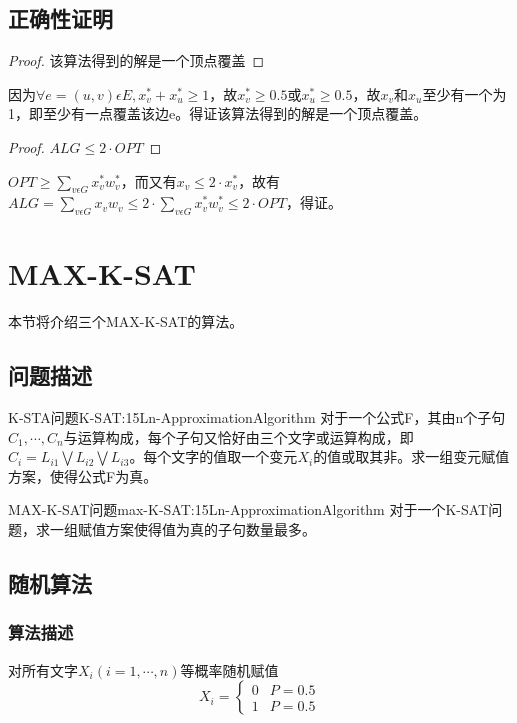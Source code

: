 \subsection{正确性证明}

\begin{proof}
	该算法得到的解是一个顶点覆盖
\end{proof}
	因为$\forall e=(u,v)\epsilon E,x_v^*+x_u^*\geqslant 1$，故$x_v^*\geqslant 0.5$或$x_u^*\geqslant 0.5$，故$x_v$和$x_u$至少有一个为1，即至少有一点覆盖该边e。得证该算法得到的解是一个顶点覆盖。
\begin{proof}
	$ALG\leqslant 2\cdot OPT$
\end{proof}
	$OPT\geqslant \sum\limits_{v\epsilon G} x_v^*w_v^*$，而又有$x_v\leqslant 2\cdot x_v^*$，故有
	$ALG=\sum\limits_{v\epsilon G} x_vw_v\leqslant 2\cdot \sum\limits_{v\epsilon G} x_v^*w_v^*\leqslant 2\cdot OPT$，得证。

\section{MAX-K-SAT}

本节将介绍三个MAX-K-SAT的算法。

\subsection{问题描述}

\begin{definition}{K-STA问题}{K-SAT:15Ln-ApproximationAlgorithm}
	对于一个公式F，其由n个子句${C_1,\cdots ,C_n}$与运算构成，每个子句又恰好由三个文字或运算构成，即$C_i=L_{i1}\bigvee L_{i2}\bigvee L_{i3}$。每个文字的值取一个变元$X_i$的值或取其非。求一组变元赋值方案，使得公式F为真。
\end{definition}

\begin{definition}{MAX-K-SAT问题}{max-K-SAT:15Ln-ApproximationAlgorithm}
	对于一个K-SAT问题，求一组赋值方案使得值为真的子句数量最多。
\end{definition}

\subsection{随机算法}

\subsubsection{算法描述}

对所有文字$X_i (i=1,\cdots,n)$等概率随机赋值
\[
	X_i=\begin{cases}
		0 &P=0.5\\
		1 &P=0.5
	\end{cases}
\]

